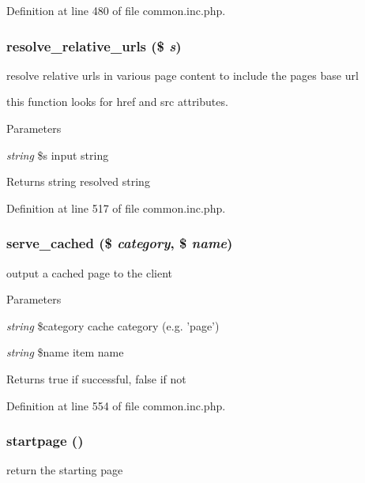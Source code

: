 Definition at line 480 of file common.inc.php.

\hypertarget{common_8inc_8php_a81eb70073067db81ab43829870f15e6d}{
\subsubsection[{resolve\_\-relative\_\-urls}]{\setlength{\rightskip}{0pt plus 5cm}resolve\_\-relative\_\-urls (\$ {\em s})}}
\label{common_8inc_8php_a81eb70073067db81ab43829870f15e6d}
resolve relative urls in various page content to include the pages base url

this function looks for href and src attributes. 
\begin{DoxyParams}{Parameters}
\item[{\em string}]\$s input string \end{DoxyParams}
\begin{DoxyReturn}{Returns}
string resolved string 
\end{DoxyReturn}


Definition at line 517 of file common.inc.php.

\hypertarget{common_8inc_8php_aac90387dcab722e243df2d083f8d6a00}{
\subsubsection[{serve\_\-cached}]{\setlength{\rightskip}{0pt plus 5cm}serve\_\-cached (\$ {\em category}, \/  \$ {\em name})}}
\label{common_8inc_8php_aac90387dcab722e243df2d083f8d6a00}
output a cached page to the client


\begin{DoxyParams}{Parameters}
\item[{\em string}]\$category cache category (e.g. 'page') \item[{\em string}]\$name item name \end{DoxyParams}
\begin{DoxyReturn}{Returns}
true if successful, false if not 
\end{DoxyReturn}


Definition at line 554 of file common.inc.php.

\hypertarget{common_8inc_8php_a0a3ee1e9beca572266648f17b9c4c75f}{
\subsubsection[{startpage}]{\setlength{\rightskip}{0pt plus 5cm}startpage ()}}
\label{common_8inc_8php_a0a3ee1e9beca572266648f17b9c4c75f}
return the starting page

